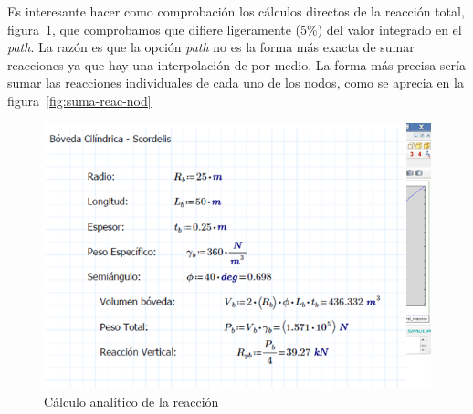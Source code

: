 \documentclass[spanish,a4paper,12pt]{article}
\begin{document}
Es interesante hacer como comprobación los cálculos directos de la reacción total, figura~\ref{fig:calc-anal-reac}, que comprobamos que difiere ligeramente (5\%) del valor integrado en el \emph{path}.
La razón es que la opción \emph{path} no es la forma más exacta de sumar reacciones ya que hay una interpolación de por medio. 
La forma más precisa sería sumar las reacciones individuales de cada uno de los nodos, como se aprecia en la figura~\ref{fig:suma-reac-nod}
\begin{figure}[!htbp]
\centering
\includegraphics{fm/Fig-5_Analitico_Reacc_Vertical}
\caption{Cálculo analítico de la reacción}
\label{fig:calc-anal-reac}
\end{figure}
\end{document}

